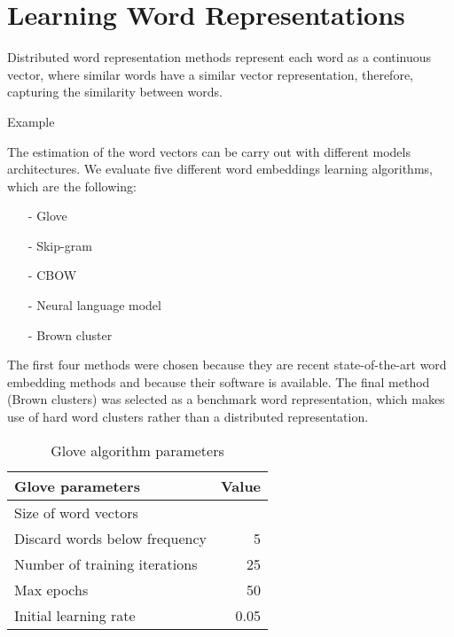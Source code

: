 
\section{Learning Word Representations}


Distributed word representation methods represent each word as a continuous vector, where similar words have a similar vector representation, therefore, capturing
the similarity between words.

{\color{red}Example}

The estimation of the word vectors can be carry out with different models architectures. We evaluate five different word embeddings learning algorithms, which are the following: 
 
\begin{itemize}
\item[-] Glove \cite{pennington2014glove}
\item[-] Skip-gram \cite{Mikolov13}
\item[-] CBOW \cite{Mikolov13}
\item[-] Neural language model \cite{collobert2011natural}
\item[-] Brown cluster \cite{Brown92class-basedn-gram}
\end{itemize}

The first four methods were chosen because they are recent
state-of-the-art word embedding methods and because their software is
available. The final method (Brown clusters) was selected as a benchmark word representation, which makes use of hard word clusters rather than a distributed representation.

\begin{table}
\centering
\begin{small}
\begin{tabular}{lr}
\hline
\textbf{Glove parameters}  & \textbf{Value} \\ \hline
Size of word vectors &  \\
Discard words below frequency & 5 \\
Number of training iterations & 25 \\
Max epochs & 50 \\
Initial learning rate & 0.05\\ \hline
\end{tabular}
\label{glove}
\caption{Glove algorithm parameters}
\end{small}
\end{table}


